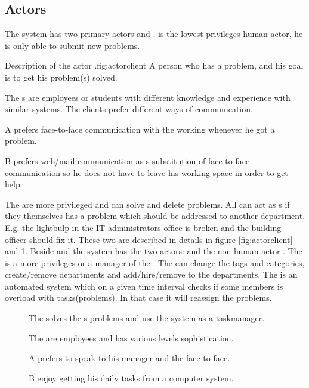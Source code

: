 \subsection{Actors}
\label{sec:actors}


The system has two primary actors \aclient{} and \astaff. \aclient[c] is the lowest privileges human actor, he is only able to submit new problems. 

\begin{sadlist}[h]{\Aclient}{Description of the actor \aclient.}{fig:actorclient}
 A person who has a problem, and his goal is to get his problem(s) solved.

 The \aclient{}s are employees or students with different knowledge and experience with similar systems. The clients prefer different ways of communication.%

 \Aclient{} A prefers face-to-face communication with the working \astaff{} whenever he got a problem. 

\aclient[c] B prefers web/mail communication as s substitution of face-to-face communication so he does not have to leave his working space in order to get help. 

\end{sadlist}


The \astaff{} are more privileged and can solve and delete problems. 
All \astaff{} can act as \aclient{}s if they themselves has a problem which should be addressed to another department. 
E.g. the lightbulp in the IT-administrators office is broken and the building officer should fix it. 
These two are described in details in figure \ref{fig:actorclient} and \ref{fig:actorstaff}. 
Beside \astaff{} and \aclient{} the system has the two actors: \sadmin{} and the non-human actor \wmon. 
The \sadmin{} is a more privileges \astaff{} or a manager of the \astaff. 
The \sadmin{} can change the tags and categories, create/remove departments and add/hire/remove \astaff{} to the departments. 
The \wmon[] is an automated system which on a given time interval checks if some \astaff{} members is overload with tasks(problems). 
In that case it will reassign the problems.




\begin{figure}[h]

\begin{sadlistar}{\Astaff}

 The \astaff{} solves the \aclient[]s problems and use the system as a taskmanager.  

 The \astaff[] are employees and has various levels sophistication.

 \astaff[c] A prefers to speak to his manager and the \aclient[] face-to-face.

\astaff[c] B enjoy getting his daily tasks from a computer system, 
 \end{sadlistar}
 \caption{}
 \label{fig:actorstaff}
 \end{figure}